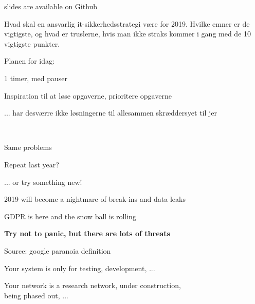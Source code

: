 \documentclass[Screen16to9,17pt]{foils}
\begin{document}


\vskip 1cm
\centerline{\footnotesize slides are available on Github}



Hvad skal en ansvarlig it-sikkerhedsstrategi være for 2019. Hvilke emner er de vigtigste, og hvad er truslerne, hvis man ikke straks kommer i gang med de 10 vigtigste punkter.



\begin{list2}
\item Planen for idag:
\item 1 timer, med pauser
\item Inspiration til at løse opgaverne, prioritere opgaverne
\item ... har desværre ikke løsningerne til allesammen skræddersyet til jer
\end{list2}


{~}

\begin{list2}
\item Same problems
\item Repeat last year?
\item ... or try something new!
\item 2019 will become a nightmare of break-ins and data leaks
\item GDPR is here and the snow ball is rolling
\end{list2}

\vskip 1cm
{\LARGE\bf Try not to panic, but there are lots of threats}




Source: google paranoia definition




Your system is only for testing, development, ...

Your network is a research network, under construction, \\
being phased out, ...
\end{document}
